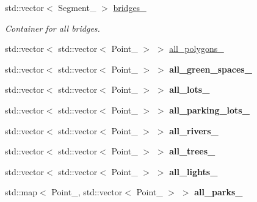 \begin{DoxyCompactItemize}
\hypertarget{class_entity_container_aea99d9281974632801f8e8274d5e35ac}{}\label{class_entity_container_aea99d9281974632801f8e8274d5e35ac} 
std\+::vector$<$ Segment\+\_ $>$ \hyperlink{class_entity_container_aea99d9281974632801f8e8274d5e35ac}{bridges\+\_\+}
\begin{DoxyCompactList}\small\item\em Container for all bridges. \end{DoxyCompactList}\item 
std\+::vector$<$ std\+::vector$<$ Point\+\_ $>$ $>$ \hyperlink{class_entity_container_a5f33573ae189549588fe11c9207374f7}{all\+\_\+polygons\+\_\+}
\item 
\hypertarget{class_entity_container_a6817baf3af18e5fcb1ed10524c5f4998}{}\label{class_entity_container_a6817baf3af18e5fcb1ed10524c5f4998} 
std\+::vector$<$ std\+::vector$<$ Point\+\_ $>$ $>$ {\bfseries all\+\_\+green\+\_\+spaces\+\_\+}
\item 
\hypertarget{class_entity_container_a38ac59ad4909159a66142c86fcb47f23}{}\label{class_entity_container_a38ac59ad4909159a66142c86fcb47f23} 
std\+::vector$<$ std\+::vector$<$ Point\+\_ $>$ $>$ {\bfseries all\+\_\+lots\+\_\+}
\item 
\hypertarget{class_entity_container_abb6d78fdd55d0b20136281831bc27d47}{}\label{class_entity_container_abb6d78fdd55d0b20136281831bc27d47} 
std\+::vector$<$ std\+::vector$<$ Point\+\_ $>$ $>$ {\bfseries all\+\_\+parking\+\_\+lots\+\_\+}
\item 
\hypertarget{class_entity_container_a995fab173a1188bf9798c762e265a94b}{}\label{class_entity_container_a995fab173a1188bf9798c762e265a94b} 
std\+::vector$<$ std\+::vector$<$ Point\+\_ $>$ $>$ {\bfseries all\+\_\+rivers\+\_\+}
\item 
\hypertarget{class_entity_container_a17f869e37db8fe181f2634829c4542b1}{}\label{class_entity_container_a17f869e37db8fe181f2634829c4542b1} 
std\+::vector$<$ std\+::vector$<$ Point\+\_ $>$ $>$ {\bfseries all\+\_\+trees\+\_\+}
\item 
\hypertarget{class_entity_container_ae5c82ecd330a6dfac1cc2b472fa25723}{}\label{class_entity_container_ae5c82ecd330a6dfac1cc2b472fa25723} 
std\+::vector$<$ std\+::vector$<$ Point\+\_ $>$ $>$ {\bfseries all\+\_\+lights\+\_\+}
\item 
\hypertarget{class_entity_container_abd407f32b3116ef9e295a30eaf3b1fb4}{}\label{class_entity_container_abd407f32b3116ef9e295a30eaf3b1fb4} 
std\+::map$<$ Point\+\_, std\+::vector$<$ Point\+\_ $>$ $>$ {\bfseries all\+\_\+parks\+\_\+}

\end{DoxyCompactItemize}
